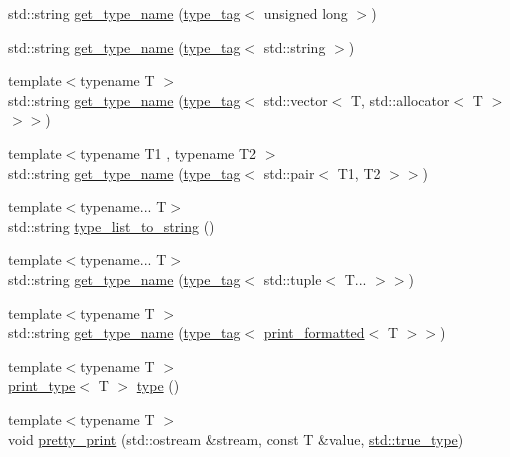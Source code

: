 \begin{DoxyCompactItemize}
\item 
std\+::string \hyperlink{namespacedbg_a5316d9f58e72c20cfbb14496326d89f1}{get\+\_\+type\+\_\+name} (\hyperlink{structdbg_1_1type__tag}{type\+\_\+tag}$<$ unsigned long $>$)
\item 
std\+::string \hyperlink{namespacedbg_a3bcf58cf4aba1da7a34e79b0fb2ce036}{get\+\_\+type\+\_\+name} (\hyperlink{structdbg_1_1type__tag}{type\+\_\+tag}$<$ std\+::string $>$)
\item 
{\footnotesize template$<$typename T $>$ }\\std\+::string \hyperlink{namespacedbg_a09680fe23089b62fd2879bd1f38897a6}{get\+\_\+type\+\_\+name} (\hyperlink{structdbg_1_1type__tag}{type\+\_\+tag}$<$ std\+::vector$<$ T, std\+::allocator$<$ T $>$$>$$>$)
\item 
{\footnotesize template$<$typename T1 , typename T2 $>$ }\\std\+::string \hyperlink{namespacedbg_aa4daf4ad755b0a3b4206debc162f064d}{get\+\_\+type\+\_\+name} (\hyperlink{structdbg_1_1type__tag}{type\+\_\+tag}$<$ std\+::pair$<$ T1, T2 $>$$>$)
\item 
{\footnotesize template$<$typename... T$>$ }\\std\+::string \hyperlink{namespacedbg_aef0097e53230ee373eaabc4981048cac}{type\+\_\+list\+\_\+to\+\_\+string} ()
\item 
{\footnotesize template$<$typename... T$>$ }\\std\+::string \hyperlink{namespacedbg_a1d187f8063d8c8c024e57a7985bcac78}{get\+\_\+type\+\_\+name} (\hyperlink{structdbg_1_1type__tag}{type\+\_\+tag}$<$ std\+::tuple$<$ T... $>$$>$)
\item 
{\footnotesize template$<$typename T $>$ }\\std\+::string \hyperlink{namespacedbg_a6224c816a1c695160e869f427854d569}{get\+\_\+type\+\_\+name} (\hyperlink{structdbg_1_1type__tag}{type\+\_\+tag}$<$ \hyperlink{structdbg_1_1print__formatted}{print\+\_\+formatted}$<$ T $>$$>$)
\item 
{\footnotesize template$<$typename T $>$ }\\\hyperlink{structdbg_1_1print__type}{print\+\_\+type}$<$ T $>$ \hyperlink{namespacedbg_a2365d80e3a3525e6025040383ff8661b}{type} ()
\item 
{\footnotesize template$<$typename T $>$ }\\void \hyperlink{namespacedbg_a4ba5b016ce65b09fef3935a945310904}{pretty\+\_\+print} (std\+::ostream \&stream, const T \&value, \hyperlink{namespacestd_a6a860513044e23d34e553ea986e83fa1}{std\+::true\+\_\+type})
$$
\end{DoxyCompactItemize}
